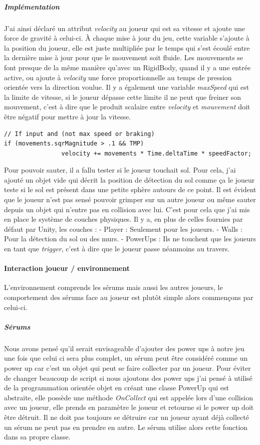 \documentclass{article}
\begin{document}
\subparagraph{Implémentation}

J'ai ainsi déclaré un attribut \emph{velocity} au joueur qui est sa vitesse et ajoute une force de gravité à celui-ci. À chaque mise à jour du jeu, cette variable s'ajoute à la position du joueur, elle est juste multipliée par le temps qui s'est écoulé entre la dernière mise à jour pour que le mouvement soit fluide.
Les mouvements se font presque de la même manière qu'avec un RigidBody, quand il y a une entrée active, ou ajoute à \emph{velocity} une force proportionnelle au temps de pression orientée vers la direction voulue. Il y a également une variable \emph{maxSpeed} qui est la limite de vitesse, si le joueur dépasse cette limite il ne peut que freiner son mouvement, c'est à dire que le produit scalaire entre \emph{velocity} et \emph{mouvement} doit être négatif pour mettre à jour la vitesse.

\begin{lstlisting}
// If input and (not max speed or braking)
if (movements.sqrMagnitude > .1 && TMP)
                velocity += movements * Time.deltaTime * speedFactor;
\end{lstlisting}

Pour pouvoir sauter, il a fallu tester si le joueur touchait sol. Pour cela, j'ai ajouté un objet vide qui décrit la position de détection du sol comme ça le joueur teste si le sol est présent dans une petite sphère autours de ce point.
Il est évident que le joueur n'est pas sensé pouvoir grimper sur un autre joueur ou même sauter depuis un objet qui n'entre pas en collision avec lui. C'est pour cela que j'ai mis en place le système de couches physiques. Il y a, en plus de celles fournies par défaut par Unity, les couches :
- Player : Seulement pour les joueurs.
- Walls : Pour la détection du sol ou des murs.
- PowerUps : Ils ne touchent que les joueurs en tant que \emph{trigger}, c'est à dire que le joueur passe néanmoins au travers.
\paragraph{Interaction joueur / environnement}

L'environnement comprends les sérums mais aussi les autres joueurs, le comportement des sérums face au joueur est plutôt simple alors commençons par celui-ci.

\subparagraph{Sérums}

Nous avons pensé qu'il serait envisageable d'ajouter des power ups à notre jeu une fois que celui ci sera plus complet, un sérum peut être considéré comme un power up car c'est un objet qui peut se faire collecter par un joueur. Pour éviter de changer beaucoup de script si nous ajoutons des power ups j'ai pensé à utilisé de la programmation orientée objet en créant une classe PowerUp qui est abstraite, elle possède une méthode \emph{OnCollect} qui est appelée lors d'une collision avec un joueur, elle prends en paramètre le joueur et retourne si le power up doit être détruit. Il ne doit pas toujours se détruire car un joueur ayant déjà collecté un sérum ne peut pas en prendre en autre. Le sérum utilise alors cette fonction dans sa propre classe.
\end{document}
